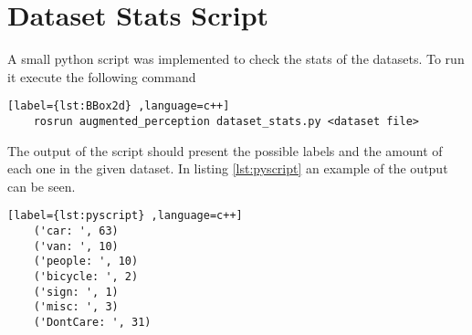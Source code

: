 \section{Dataset Stats Script}

A small python script was implemented to check the stats of the datasets. To run it execute the following command 

\begin{center}
	\begin{lstlisting}[label={lst:BBox2d} ,language=c++]
	rosrun augmented_perception dataset_stats.py <dataset file>\end{lstlisting}
\end{center}

The output of the script should present the possible labels and the amount of each one in the given dataset. In listing \ref{lst:pyscript} an example of the output can be seen.

\begin{center}
	\begin{lstlisting}[label={lst:pyscript} ,language=c++]
	('car: ', 63)
	('van: ', 10)
	('people: ', 10)
	('bicycle: ', 2)
	('sign: ', 1)
	('misc: ', 3)
	('DontCare: ', 31)\end{lstlisting}
\end{center}
